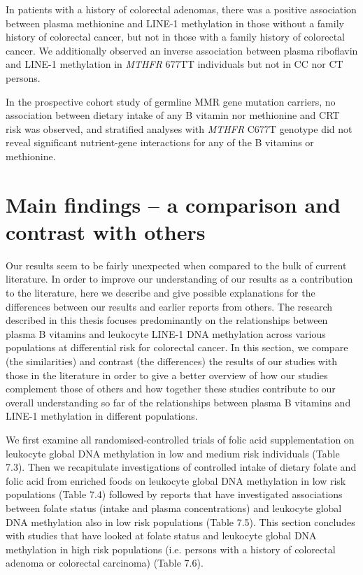 \noindent In patients with a history of colorectal adenomas, there was a positive association between plasma methionine and LINE-1 methylation in those without a family history of colorectal cancer, but not in those with a family history of colorectal cancer. We additionally observed an inverse association between plasma riboflavin and LINE-1 methylation in \emph{MTHFR} 677TT individuals but not in CC nor CT persons. 
 
\noindent In the prospective cohort study of germline MMR gene mutation carriers, no association between dietary intake of any B vitamin nor methionine and CRT risk was observed, and stratified analyses with \emph{MTHFR} C677T genotype did not reveal significant nutrient-gene interactions for any of the B vitamins or methionine. 
 
\section{Main findings -- a comparison and contrast with others} %
Our results seem to be fairly unexpected when compared to the bulk of current literature. In order to improve our understanding of our results as a contribution to the literature, here we describe and give possible explanations for the differences between our results and earlier reports from others. The research described in this thesis focuses predominantly on the relationships between plasma B vitamins and leukocyte LINE-1 DNA methylation across various populations at differential risk for colorectal cancer. In this section, we compare (the similarities) and contrast (the differences) the results of our studies with those in the literature in order to give a better overview of how our studies complement those of others and how together these studies contribute to our overall understanding so far of the relationships between plasma B vitamins and LINE-1 methylation in different populations. 
 
\noindent We first examine all randomised-controlled trials of folic acid supplementation on leukocyte global DNA methylation in low and medium risk individuals (Table 7.3). Then we recapitulate investigations of controlled intake of dietary folate and folic acid from enriched foods on leukocyte global DNA methylation in low risk populations (Table 7.4) followed by reports that have investigated associations between folate status (intake and plasma concentrations) and leukocyte global DNA methylation also in low risk populations (Table 7.5). This section concludes with studies that have looked at folate status and leukocyte global DNA methylation in high risk populations (i.e. persons with a history of colorectal adenoma or colorectal carcinoma) (Table 7.6). 
 
